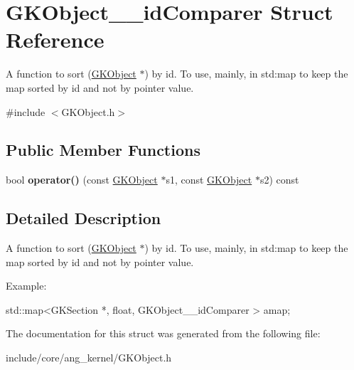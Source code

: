 \hypertarget{structGKObject____idComparer}{}\section{G\+K\+Object\+\_\+\+\_\+id\+Comparer Struct Reference}
\label{structGKObject____idComparer}


A function to sort (\hyperlink{classGKObject}{G\+K\+Object} $\ast$) by id. To use, mainly, in std\+:map to keep the map sorted by id and not by pointer value.  




{\ttfamily \#include $<$G\+K\+Object.\+h$>$}

\subsection*{Public Member Functions}
\begin{DoxyCompactItemize}
\item 
bool {\bfseries operator()} (const \hyperlink{classGKObject}{G\+K\+Object} $\ast$s1, const \hyperlink{classGKObject}{G\+K\+Object} $\ast$s2) const \hypertarget{structGKObject____idComparer_a478eab115a3b2082641fbe6ec5206656}{}\label{structGKObject____idComparer_a478eab115a3b2082641fbe6ec5206656}

\end{DoxyCompactItemize}


\subsection{Detailed Description}
A function to sort (\hyperlink{classGKObject}{G\+K\+Object} $\ast$) by id. To use, mainly, in std\+:map to keep the map sorted by id and not by pointer value. 

Example\+: 
\begin{DoxyCode}
std::map<GKSection *, float, GKObject\_\_idComparer > amap;
\end{DoxyCode}
 

The documentation for this struct was generated from the following file\+:\begin{DoxyCompactItemize}
\item 
include/core/ang\+\_\+kernel/G\+K\+Object.\+h\end{DoxyCompactItemize}
